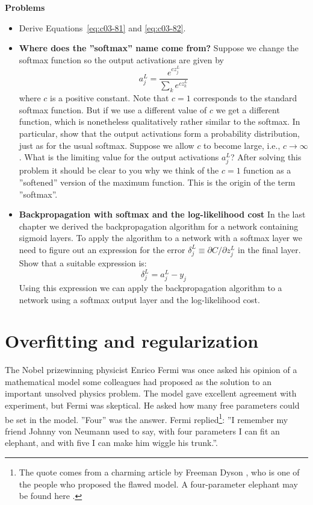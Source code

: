 \textbf{Problems}
\begin{itemize}
\item 
Derive Equations~\ref{eq:c03-81}  and \ref{eq:c03-82}.

\item 
\textbf{Where does the ''softmax'' name come from?} Suppose we change the softmax function so the output activations are given by 
\begin{equation}
a_{j}^{L}=\frac{e^{c z_{j}^{L}}}{\sum_{k} e^{c z_{k}^{L}}}
\label{eq:c03-83} 
\end{equation}
where $c$ is a positive constant. Note that $c=1$ corresponds to the standard softmax function. But if we use a different value of $c$ we get a different function, which is nonetheless qualitatively rather similar to the softmax. In particular, show that the output activations form a probability distribution, just as for the usual softmax. Suppose we allow $c$ to become large, i.e., $c \rightarrow \infty$. What is the limiting value for the output activations $a^L_j$? After solving this problem it should be clear to you why we think of the $c=1$ function as a ''softened'' version of the maximum function. This is the origin of the term ''softmax''.


\item 
\textbf{Backpropagation with softmax and the log-likelihood cost} In the last chapter we derived the backpropagation algorithm for a network containing sigmoid layers. To apply the algorithm to a network with a softmax layer we need to figure out an expression for the error $\delta_{j}^{L} \equiv \partial C / \partial z_{j}^{L}$ in the final layer. Show that a suitable expression is: 
\begin{equation}
\delta_{j}^{L}=a_{j}^{L}-y_{j}
\label{eq:c03-84} 
\end{equation}
Using this expression we can apply the backpropagation algorithm to a network using a softmax output layer and the log-likelihood cost.
\end{itemize}



\section{Overfitting and regularization}
\label{sec:Overfittingandregularization}

The Nobel prizewinning physicist Enrico Fermi was once asked his opinion of a mathematical model some colleagues had proposed as the solution to an important unsolved physics problem. The model gave excellent agreement with experiment, but Fermi was skeptical. He asked how many free parameters could be set in the model. ''Four'' was the answer. Fermi replied\footnote{The quote comes from a charming article by Freeman Dyson \cite{Dyson2004}, who is one of the people who proposed the flawed model. A four-parameter elephant may be found here \cite{Cook2011}.}: ''I remember my friend Johnny von Neumann used to say, with four parameters I can fit an elephant, and with five I can make him wiggle his trunk.''.

